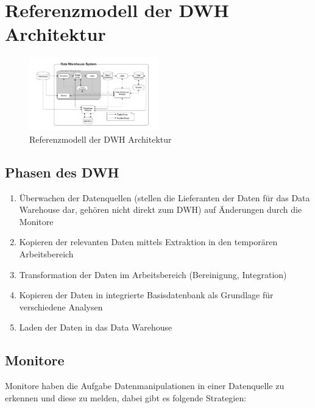 \section{Referenzmodell der DWH Architektur}

\begin{figure}[H]
    \centering
    \includegraphics[width=0.5\textwidth]{Content/images/dwh/dwh.png}
    \caption{Referenzmodell der DWH Architektur}
    \label{fig:dwh:dwh}
\end{figure}

\subsection{Phasen des DWH}

\begin{enumerate}
    \item Überwachen der Datenquellen (stellen die Lieferanten der Daten für das Data Warehouse dar, gehören nicht direkt zum DWH) auf Änderungen durch die Monitore
    \item Kopieren der relevanten Daten mittels Extraktion in den temporären Arbeitsbereich
    \item Transformation der Daten im Arbeitsbereich (Bereinigung, Integration)
    \item Kopieren der Daten in integrierte Basisdatenbank als Grundlage für verschiedene Analysen
    \item Laden der Daten in das Data Warehouse

\end{enumerate}

\subsection{Monitore}

Monitore haben die Aufgabe Datenmanipulationen in einer Datenquelle zu erkennen und diese zu melden, dabei gibt es folgende Strategien:

